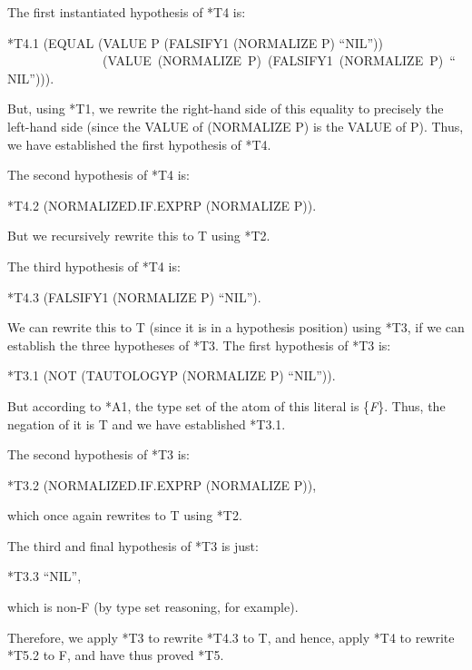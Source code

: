\documentclass[10pt]{book}
\newenvironment{pubasis}{\begin{flushleft}}{\end{flushleft}}
\begin{document}
The first instantiated hypothesis of *T4 is:

\begin{pubasis}
*T4.1	(EQUAL (VALUE P (FALSIFY1 (NORMALIZE P) ``NIL''))\\
~~~~~~~~~~~~~~~(VALUE~(NORMALIZE~P)~(FALSIFY1~(NORMALIZE~P)~``NIL''))).\\
\end{pubasis}
But, using *T1, we  rewrite the right-hand side of this equality
to precisely the left-hand side (since the VALUE of (NORMALIZE P)
is  the VALUE of P).  Thus, we have established the first
hypothesis of *T4.

The second hypothesis of *T4 is:

\begin{pubasis}
*T4.2	(NORMALIZED.IF.EXPRP (NORMALIZE P)).\\
\end{pubasis}
But we  recursively rewrite this to T using *T2.

The third hypothesis of *T4 is:

\begin{pubasis}
*T4.3	(FALSIFY1 (NORMALIZE P) ``NIL'').\\
\end{pubasis}
We can rewrite this to T (since it is in a hypothesis position) using *T3, if
we can establish the three hypotheses of *T3.
The first hypothesis of *T3 is:

\begin{pubasis}
*T3.1	(NOT (TAUTOLOGYP (NORMALIZE P) ``NIL'')).\\
\end{pubasis}
But according to *A1, the type set of the atom of this
literal is \{\emph{F}\}.  Thus, the negation of it is T and we have
established *T3.1.

The second hypothesis of *T3 is:
\begin{pubasis}
*T3.2	(NORMALIZED.IF.EXPRP (NORMALIZE P)),\\
\end{pubasis}
which once again rewrites to T using *T2.

The third and final hypothesis of *T3 is just:
\begin{pubasis}
*T3.3	``NIL'',\\
\end{pubasis}
which is non-F (by type set reasoning, for example).

Therefore, we apply *T3 to rewrite *T4.3 to T, and hence,
apply *T4 to rewrite *T5.2 to F, and have thus proved *T5.
\end{document}
